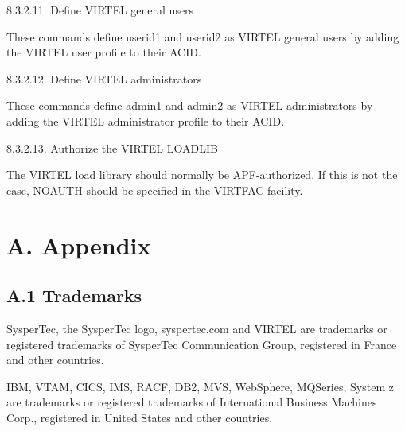 \documentclass[letterpaper,10pt,english]{sphinxmanual}
\begin{document}
8.3.2.11. Define VIRTEL general users

\begin{sphinxVerbatim}[commandchars=\\\{\}]
  
  
\end{sphinxVerbatim}


These commands define userid1 and userid2 as VIRTEL general users by adding the VIRTEL user profile to their ACID.

8.3.2.12. Define VIRTEL administrators

\begin{sphinxVerbatim}[commandchars=\\\{\}]
  
  
\end{sphinxVerbatim}


These commands define admin1 and admin2 as VIRTEL administrators by adding the VIRTEL administrator profile to their ACID.

8.3.2.13. Authorize the VIRTEL LOADLIB

The VIRTEL load library should normally be APF-authorized. If this is not the case, NOAUTH should be specified in the VIRTFAC facility.


\chapter{A. Appendix}
\label{\detokenize{Installation_Guide:a-appendix}}

\section{A.1 Trademarks}
\label{\detokenize{Installation_Guide:a-1-trademarks}}
SysperTec, the SysperTec logo, syspertec.com and VIRTEL are trademarks or registered trademarks of SysperTec
Communication Group, registered in France and other countries.

IBM, VTAM, CICS, IMS, RACF, DB2, MVS, WebSphere, MQSeries, System z are trademarks or registered trademarks of
International Business Machines Corp., registered in United States and other countries.
\end{document}
